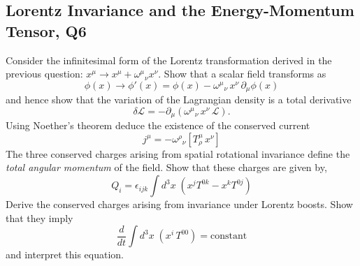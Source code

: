 \subsection{Lorentz Invariance and the Energy-Momentum Tensor, Q6}
Consider the infinitesimal form of the Lorentz transformation derived in the previous question: $x^\mu \to x^\mu + \omega^\mu{}_\nu x^\nu$. Show that a scalar field transforms as
\begin{equation}
    \phi(x) \to \phi'(x) = \phi(x) - \omega^\mu{}_\nu\, x^\nu\, \partial_\mu\phi(x)
\end{equation}
and hence show that the variation of the Lagrangian density is a total derivative
\begin{equation}
    \delta\mathcal{L} = -\partial_\mu(\omega^\mu{}_\nu\, x^\nu\, \mathcal{L}).
\end{equation}
Using Noether's theorem deduce the existence of the conserved current
\begin{equation}
    j^\mu = -\omega^\rho{}_\nu\left[T^\mu_\rho\, x^\nu\right]
\end{equation}
The three conserved charges arising from spatial rotational invariance define the \textit{total angular momentum} of the field. Show that these charges are given by,
\begin{equation}
    Q_i = \epsilon_{ijk}\int d^3x\;\left(x^j T^{0k} - x^k T^{0j}\right)
\end{equation}
Derive the conserved charges arising from invariance under Lorentz boosts. Show that they imply
\begin{equation}
    \frac{d}{dt}\int d^3x\;\left(x^i\, T^{00}\right) = \text{constant}
\end{equation}
and interpret this equation.
